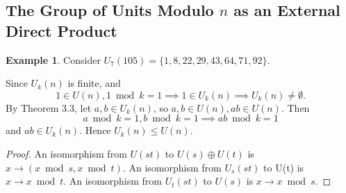 \documentclass{article}
\newtheorem{theorem}{Theorem}[section]
\newtheorem{corollary}{Corollary}[theorem]
\theoremstyle{definition}
\newtheorem{definition}{Definition}[section]
\newtheorem{example}{Example}[section]
\begin{document}
     \subsection{The Group of Units Modulo $n$ as an External Direct Product}
     
     \begin{example}
        Consider $U_7(105) = \{1,8,22,29,43,64,71,92\}.$
     \end{example}
     
     Since $U_k(n)$ is finite, and 
     \begin{equation*}
         1 \in U(n), 1 \bmod k = 1 \implies 1 \in U_k(n) \implies U_k(n) \neq \emptyset.
     \end{equation*}
     By Theorem 3.3, let $a,b \in U_k(n)$, so $a,b \in U(n), ab \in U(n)$. Then 
     \begin{equation*}
         a \bmod k = 1, b \bmod k = 1 \implies ab \bmod k = 1
     \end{equation*}
     and $ab \in U_k(n)$. Hence $U_k(n) \leq U(n)$.
     
     \noindent{}
     
     \begin{proof}
        An isomorphism from $U(st)$ to $U(s) \oplus U(t)$ is $x \to (x \bmod s, x \bmod t)$. An isomorphism from $U_s(st)$ to U(t) is $x \to x \bmod t$. An isomorphism from $U_t(st)$ to $U(s)$ is $x \to x \bmod s$.
     \end{proof}
     
     \noindent{}
     
\end{document}
